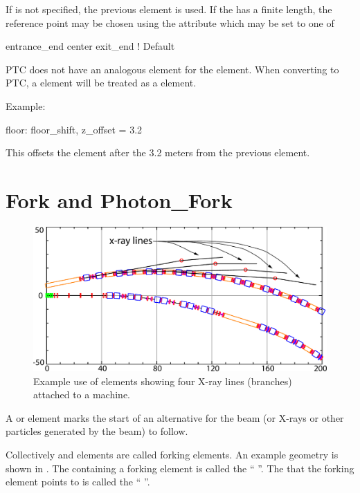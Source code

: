 If  is not specified, the previous element is used. If the
 has a finite length, the reference point may be chosen
using the  attribute which may be set to one of
\begin{example}
  entrance_end
  center
  exit_end         ! Default
\end{example}

PTC does not have an analogous element for the 
element. When converting to PTC, a  element will be treated
as a  element.

Example: 
\begin{example}
  floor: floor_shift, z_offset = 3.2
\end{example}
This offsets the element after the  3.2 meters from the previous
element.

\section{Fork and Photon_Fork}
\label{s:fork}

\begin{figure}[tb]
  \centering
  \includegraphics[width=5in]{x-fork.pdf}
  \caption[Example with photon_fork elements.]
  {
Example use of  elements showing four X-ray lines (branches)
attached to a machine.
  }
  \label{f:x.fork}
\end{figure}

A  or  element marks the start of an
alternative  for the beam (or X-rays or other
particles generated by the beam) to follow. 

Collectively  and  elements are called
forking elements. An example geometry is shown in .  The
 containing a forking element is called the ``
''. The  that the forking element points to is
called the `` ''. 

